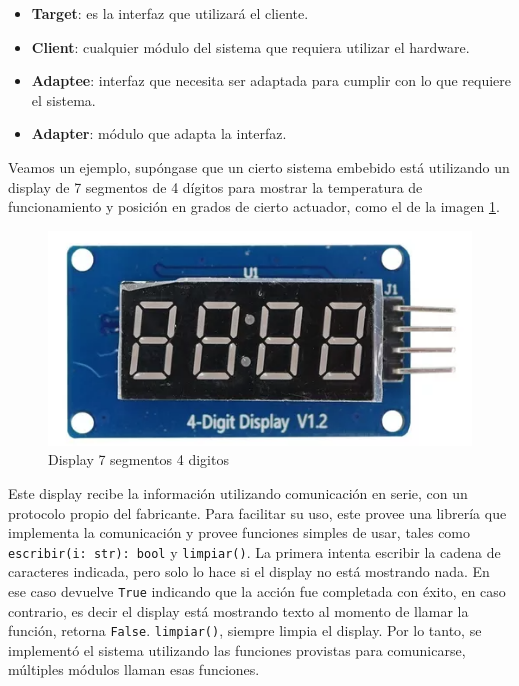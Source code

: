\begin{itemize}
    \item \textbf{Target}: es la interfaz que utilizará el cliente.
    \item \textbf{Client}: cualquier módulo del sistema que requiera utilizar el hardware.
    \item \textbf{Adaptee}: interfaz que necesita ser adaptada para cumplir con lo que requiere el sistema.
    \item \textbf{Adapter}: módulo que adapta la interfaz.
\end{itemize}

Veamos un ejemplo, supóngase que un cierto sistema embebido está utilizando un display de 7 segmentos de 4 dígitos para mostrar la temperatura de funcionamiento y posición en grados de cierto actuador, como el de la imagen \ref{fig:enter-label}.

\begin{figure}[h]
    \centering
    \includegraphics[width=0.5\linewidth]{display.png}
    \caption{Display 7 segmentos 4 digitos}
    \label{fig:enter-label}
\end{figure}

Este display recibe la información utilizando comunicación en serie, con un protocolo propio del fabricante. Para facilitar su uso, este provee una librería que implementa la comunicación y provee funciones simples de usar, tales como \verb|escribir(i: str): bool| y \verb|limpiar()|. La primera intenta escribir la cadena de caracteres indicada, pero solo lo hace si el display no está mostrando nada. En ese caso devuelve \verb|True| indicando que la acción fue completada con éxito, en caso contrario, es decir el display está mostrando texto al momento de llamar la función, retorna \verb|False|. \verb|limpiar()|, siempre limpia el display. Por lo tanto, se implementó el sistema utilizando las funciones provistas para comunicarse, múltiples módulos llaman esas funciones.

